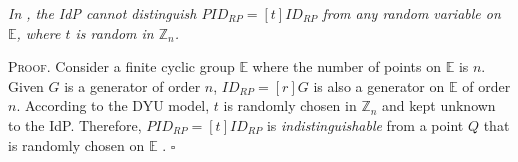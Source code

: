 \vspace{3mm}
 {\em In \usso, the IdP cannot distinguish $PID_{RP} = [t]ID_{RP}$ from any random variable on $\mathbb{E}$, where $t$ is random in $\mathbb{Z}_n$.} %

\vspace{0.75mm}
\noindent \textsc{Proof.}
Consider a finite cyclic group $\mathbb{E}$ where the number of points on $\mathbb{E}$ is $n$. Given $G$ is a generator of order $n$, $ID_{RP} = [r]G$ is also a generator on $\mathbb{E}$ of order $n$. According to the DYU model, $t$ is randomly chosen in $\mathbb{Z}_n$ and kept unknown to the IdP. Therefore, $PID_{RP} = [t]ID_{RP}$ is \emph{indistinguishable} from a point $Q$ that is randomly chosen on $\mathbb{E}$ \cite{oprf-proved,strong-oprf}. \hfill $\square$






